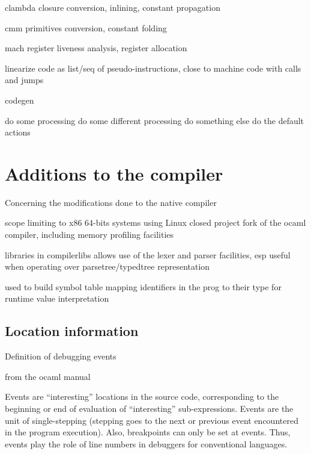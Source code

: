 clambda
closure conversion, inlining, constant propagation

cmm
primitives conversion, constant folding

mach
register liveness analysis, register allocation

linearize
code as list/seq of pseudo-instructions, close to machine code
with calls and jumps

codegen


\begin{algorithmic}[1]
	\State do some processing
	\State do some different processing
	\State do something else
	\Else
	\State do the default actions
	\EndIf
\end{algorithmic}

\section{Additions to the compiler}

Concerning the modifications done to the native compiler

scope limiting to x86 64-bits systems using Linux
closed project fork of the ocaml compiler,
including memory profiling facilities

libraries in compilerlibs allows use of the lexer and parser facilities, esp
useful when operating over parsetree/typedtree representation

used to build symbol table mapping identifiers in the prog to their type
for runtime value interpretation

\subsection{Location information}

Definition of debugging events

from the ocaml manual

Events are “interesting” locations in the source code, corresponding to the beginning or end of evaluation of “interesting” sub-expressions. Events are the unit of single-stepping (stepping goes to the next or previous event encountered in the program execution). Also, breakpoints can only be set at events. Thus, events play the role of line numbers in debuggers for conventional languages.

